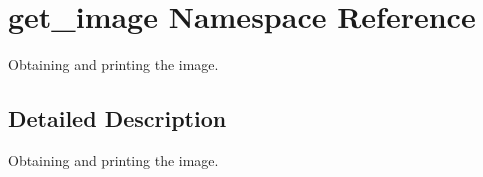 \hypertarget{namespaceget__image}{}\section{get\+\_\+image Namespace Reference}
\label{namespaceget__image}


Obtaining and printing the image.  




\subsection{Detailed Description}
Obtaining and printing the image. 